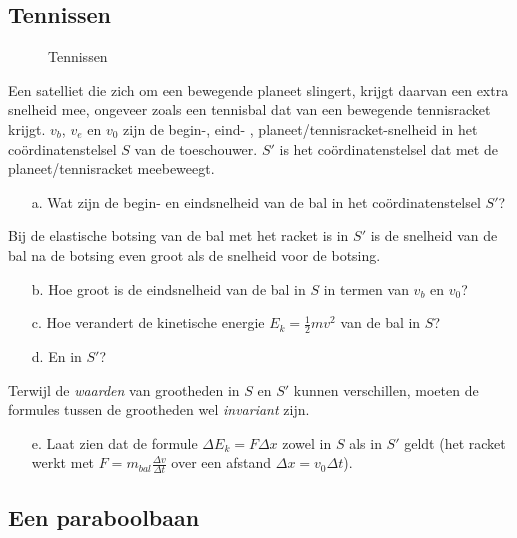 \subsection{Tennissen}
 \begin{figure} [h]
 \begin{center}
 \mbox{\epsfxsize=10cm}
 \caption{Tennissen}
 \label{f:tennis}
 \end{center}
 \end{figure}
Een satelliet die zich om een bewegende planeet slingert, krijgt
daarvan een extra snelheid mee, ongeveer zoals een tennisbal dat van een
bewegende tennisracket krijgt. $v_{b}$, $v_{e}$ en $v_{0}$ zijn de
begin-, eind- , planeet/tennisracket-snelheid in het co\"ordinatenstelsel
$S$ van de toeschouwer. $S'$ is het co\"ordinatenstelsel dat met de
planeet/tennisracket meebeweegt.
\begin{itemize}
\item [a.]
Wat zijn de begin- en eindsnelheid van de bal in het 
co\"{o}rdinatenstelsel $S'$?
\end{itemize}
Bij de elastische botsing van de bal met het racket is in $S'$
is de snelheid van de bal na de botsing even groot 
als de snelheid voor de botsing.
\begin{itemize}
\item [b.]
Hoe groot is de eindsnelheid van de bal in $S$ in termen 
van $v_{b}$ en $v_{0}$?
\item [c.]
Hoe verandert de kinetische energie $E_{k} = \frac{1}{2}mv^{2}$ van de bal 
in $S$?
\item[d.] 
En in $S'$?
\end{itemize}
Terwijl  de {\it waarden} van grootheden in $S$ en $S'$ kunnen verschillen, 
moeten de formules tussen de  grootheden  wel {\it invariant} zijn. 
\begin{itemize}
\item [e.]
Laat zien dat de formule $\Delta E_{k} =F\Delta x$ zowel in $S$ als in $S'$ 
geldt (het racket werkt met $F = m_{bal}\frac{\Delta v}{\Delta t}$ over een 
afstand $\Delta x = v_{0} \Delta {t}$).
\end{itemize}
%

\subsection{Een paraboolbaan}

